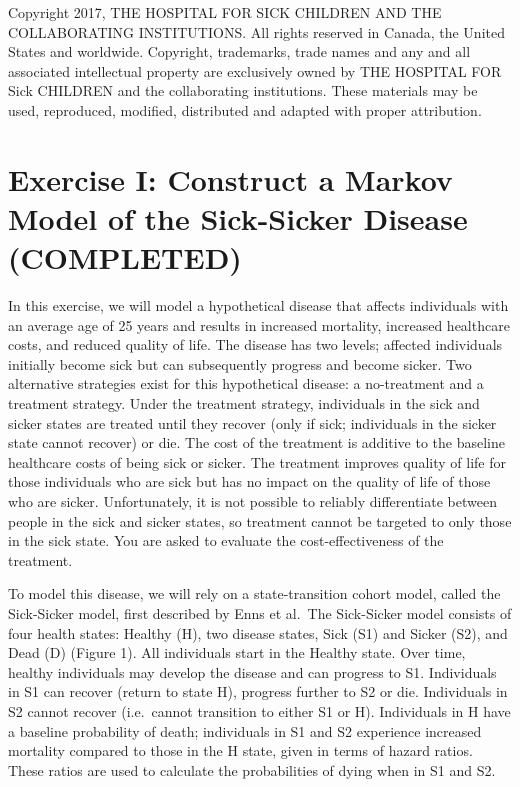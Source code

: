 \documentclass[
]{article}
\begin{document}
Copyright 2017, THE HOSPITAL FOR SICK CHILDREN AND THE COLLABORATING
INSTITUTIONS. All rights reserved in Canada, the United States and
worldwide. Copyright, trademarks, trade names and any and all associated
intellectual property are exclusively owned by THE HOSPITAL FOR Sick
CHILDREN and the collaborating institutions. These materials may be
used, reproduced, modified, distributed and adapted with proper
attribution.

\hypertarget{exercise-i-construct-a-markov-model-of-the-sick-sicker-disease-completed}{%
\section{Exercise I: Construct a Markov Model of the Sick-Sicker Disease
(COMPLETED)}\label{exercise-i-construct-a-markov-model-of-the-sick-sicker-disease-completed}}

In this exercise, we will model a hypothetical disease that affects
individuals with an average age of 25 years and results in increased
mortality, increased healthcare costs, and reduced quality of life. The
disease has two levels; affected individuals initially become sick but
can subsequently progress and become sicker. Two alternative strategies
exist for this hypothetical disease: a no-treatment and a treatment
strategy. Under the treatment strategy, individuals in the sick and
sicker states are treated until they recover (only if sick; individuals
in the sicker state cannot recover) or die. The cost of the treatment is
additive to the baseline healthcare costs of being sick or sicker. The
treatment improves quality of life for those individuals who are sick
but has no impact on the quality of life of those who are sicker.
Unfortunately, it is not possible to reliably differentiate between
people in the sick and sicker states, so treatment cannot be targeted to
only those in the sick state. You are asked to evaluate the
cost-effectiveness of the treatment.

To model this disease, we will rely on a state-transition cohort model,
called the Sick-Sicker model, first described by Enns et al.~The
Sick-Sicker model consists of four health states: Healthy (H), two
disease states, Sick (S1) and Sicker (S2), and Dead (D) (Figure 1). All
individuals start in the Healthy state. Over time, healthy individuals
may develop the disease and can progress to S1. Individuals in S1 can
recover (return to state H), progress further to S2 or die. Individuals
in S2 cannot recover (i.e.~cannot transition to either S1 or H).
Individuals in H have a baseline probability of death; individuals in S1
and S2 experience increased mortality compared to those in the H state,
given in terms of hazard ratios. These ratios are used to calculate the
probabilities of dying when in S1 and S2.
\end{document}
